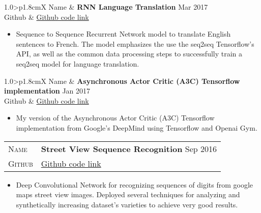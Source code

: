 \documentclass[10pt, a4paper, oneside, final]{scrartcl} %
\newcommand{\gray}{\rowcolor[gray]{.90}} %
\begin{document}
\begin{center}
\begin{tabularx}{1.0\linewidth}{>{\raggedleft\scshape}p{1.8cm}X}
\gray Name & \textbf{RNN Language Translation} \hfill Mar 2017\\
\gray Github & \href{https://github.com/thalles753/deep-learning/tree/master/language-translation}{Github code link}
\end{tabularx}
\end{center}

\begin{itemize}\itemsep1.5pt
\item Sequence to Sequence Recurrent Network model to translate English sentences to French. The model emphasizes the use the seq2seq Tensorflow's API, as well as the common data processing steps to successfully train a seq2seq model for language translation.
\end{itemize}

\begin{center}
\begin{tabularx}{1.0\linewidth}{>{\raggedleft\scshape}p{1.8cm}X}
\gray Name & \textbf{Asynchronous Actor Critic (A3C) Tensorflow implementation} \hfill Jan 2017\\
\gray Github & \href{https://github.com/thalles753/machine-learning/tree/master/projects/A3C}{Github code link}
\end{tabularx}
\end{center}

\begin{itemize}\itemsep1.5pt
\item My version of the Asynchronous Actor Critic (A3C) Tensorflow implementation from Google's DeepMind using Tensorflow and Openai Gym.
\end{itemize}

\begin{center}
\begin{tabularx}{1.0\linewidth}{>{\raggedleft\scshape}p{1.8cm}X}
\gray Name & \textbf{Street View Sequence Recognition} \hfill Sep 2016\\
\gray Github & \href{https://github.com/thalles753/machine-learning/tree/master/projects/capstone/sequence_recognition}{Github code link}
\end{tabularx}
\end{center}

\begin{itemize}\itemsep1.5pt
\item Deep Convolutional Network for recognizing sequences of digits from google maps street view images. Deployed several techniques for analyzing and synthetically increasing dataset's varieties to achieve very good results.
\end{itemize}
\end{document}
